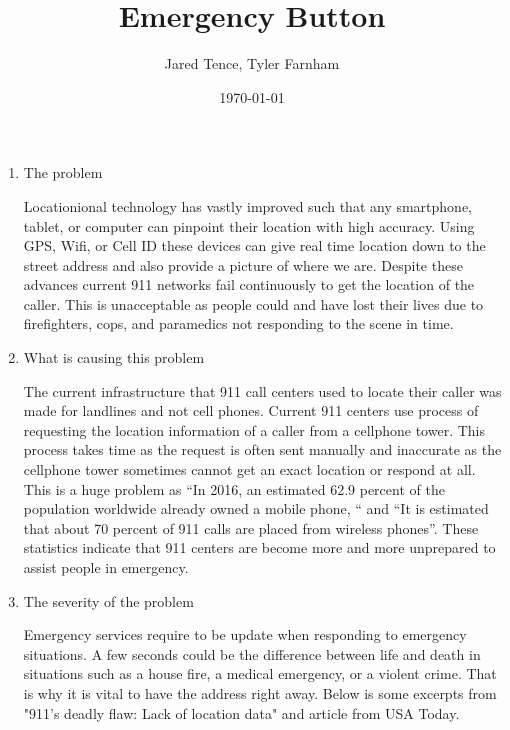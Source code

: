 \documentclass[12pt]{article}
\title{Emergency Button}
\author{Jared Tence, Tyler Farnham}
\date{\today}
\begin{document}
\maketitle

\begin{enumerate}
\item The problem

Locationional technology has vastly improved such that any smartphone, tablet, or computer can pinpoint their location with high accuracy. Using GPS, Wifi, or Cell ID these devices can give real time location down to the street address and also provide a picture of where we are. Despite these advances current 911 networks fail continuously to get the location of the caller. This is unacceptable as people could and have lost their lives due to firefighters, cops, and paramedics not responding to the scene in time.


\item What is causing this problem

The current infrastructure that 911 call centers used to locate their caller was made for landlines and not cell phones. Current 911 centers use process of requesting the location information of a caller from a cellphone tower. This process takes time as the request is often sent manually and inaccurate as the cellphone tower sometimes cannot get an exact location or respond at all. This is a huge problem as “In 2016, an estimated 62.9 percent of the population worldwide already owned a mobile phone, “ and “It is estimated that about 70 percent of 911 calls are placed from wireless phones”. These statistics indicate that 911 centers are become more and more unprepared to assist people in emergency.


\item The severity of the problem

Emergency services require to be update when responding to emergency situations. A few seconds could be the difference between life and death in situations such as a house fire, a medical emergency, or a violent crime. That is why it is vital to have the address right away. Below is some excerpts from "911's deadly flaw: Lack of location data" and article from USA Today. \cite{flaw}


\end{enumerate}
\end{document}
